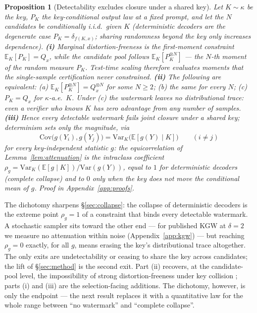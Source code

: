 \documentclass{article} %
\newtheorem{proposition}{Proposition}
\begin{document}
\begin{proposition}[Detectability excludes closure under a shared key]\label{prop:moments}
Let $K\sim\kappa$ be the key, $P_K$ the key-conditional output law at a
fixed prompt, and let the $N$ candidates be conditionally i.i.d.\ given $K$
(deterministic decoders are the degenerate case $P_K=\delta_{f(K,x)}$;
sharing randomness beyond the key only increases dependence).
\textbf{(i)} Marginal distortion-freeness is the first-moment constraint
$\mathbb E_K[P_K]=Q_x$, while the candidate pool follows
$\mathbb E_K[P_K^{\otimes N}]$ --- the $N$-th moment of the random measure
$P_K$. Test-time scaling therefore evaluates moments that the single-sample
certification never constrained.
\textbf{(ii)} The following are equivalent:
(a) $\mathbb E_K[P_K^{\otimes N}]=Q_x^{\otimes N}$ for some $N\ge2$;
(b) the same for every $N$;
(c) $P_K=Q_x$ for $\kappa$-a.e.\ $K$.
Under (c) the watermark leaves no distributional trace: even a verifier who
knows $K$ has zero advantage from any number of samples.
\textbf{(iii)} Hence every detectable watermark fails joint closure under a
shared key; determinism sets only the \emph{magnitude}, via
\[
\mathrm{Cov}\big(g(Y_i),g(Y_j)\big)
=\mathrm{Var}_K\big(\mathbb E[g(Y)\mid K]\big)\qquad(i\ne j)
\]
for every key-independent statistic $g$: the equicorrelation of
Lemma~\ref{lem:attenuation} is the intraclass coefficient
$\rho_g=\mathrm{Var}_K(\mathbb E[g\mid K])/\mathrm{Var}(g(Y))$, equal to
$1$ for deterministic decoders (complete collapse) and to $0$ only when the
key does not move the conditional mean of $g$. Proof in
Appendix~\ref{app:proofs}.
\end{proposition}

The dichotomy sharpens \S\ref{sec:collapse}: the collapse of deterministic
decoders is the extreme point $\rho_g=1$ of a constraint that binds every
detectable watermark. A stochastic sampler sits toward the other end --- for
published KGW at $\delta{=}2$ we measure no attenuation within noise
(Appendix~\ref{app:kgw}) --- but reaching $\rho_g=0$ exactly, for all $g$,
means erasing the key's distributional trace altogether. The only exits are
undetectability or ceasing to share the key across candidates; the lift of
\S\ref{sec:method} is the second exit. Part (ii) recovers, at the
candidate-pool level, the impossibility of strong distortion-freeness under
key collision \citep[Theorem~4.10]{keycollision2024}; parts (i) and (iii)
are the selection-facing additions. The dichotomy, however, is only the
endpoint --- the next result replaces it with a quantitative law for the
whole range between ``no watermark'' and ``complete collapse''.
\end{document}
